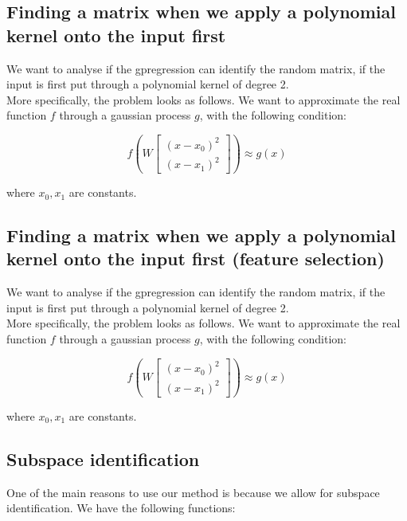 \subsection{Finding a matrix when we apply a polynomial kernel onto the input first}
We want to analyse if the gpregression can identify the random matrix, if the input is first put through a polynomial kernel of degree 2. \\

More specifically, the problem looks as follows.
We want to approximate the real function $ f $ through a gaussian process $ g $, with the following condition:

\def\B{
\begin{bmatrix}
    (x - x_0)^2 \\
    (x - x_1)^2
\end{bmatrix}}

\begin{equation}
f \left( W \B \right) \approx g \left( x \right)
\end{equation} 

where $x_0, x_1$ are constants.

\subsection{Finding a matrix when we apply a polynomial kernel onto the input first (feature selection)}
We want to analyse if the gpregression can identify the random matrix, if the input is first put through a polynomial kernel of degree 2. \\

More specifically, the problem looks as follows.
We want to approximate the real function $ f $ through a gaussian process $ g $, with the following condition:

\def\B{
\begin{bmatrix}
    (x - x_0)^2 \\
    (x - x_1)^2
\end{bmatrix}}

\begin{equation}
f \left( W \B \right) \approx g \left( x \right)
\end{equation} 

where $x_0, x_1$ are constants.


\subsection{Subspace identification}
One of the main reasons to use our method is because we allow for subspace identification.
We have the following functions:


